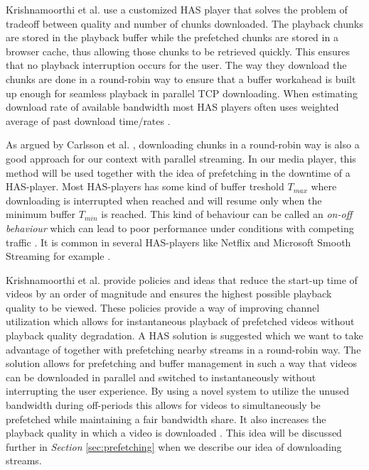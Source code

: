 Krishnamoorthi et al. \cite{qualbranch} use a customized HAS player that solves the problem of tradeoff between quality and number of chunks downloaded. The playback chunks are stored in the playback buffer while the prefetched chunks are stored in a browser cache, thus allowing those chunks to be retrieved quickly. This ensures that no playback interruption occurs for the user. The way they download the chunks are done in a round-robin way to ensure that a buffer workahead is built up enough for seamless playback in parallel TCP downloading. When estimating download rate of available bandwidth most HAS players often uses weighted average of past download time/rates \cite{qualbranch}. 

As argued by Carlsson et al. \cite{optimizedstreaming}, downloading chunks in a round-robin way is also a good approach for our context with parallel streaming. In our media player, this method will be used together with the idea of prefetching in the downtime of a HAS-player. Most HAS-players has some kind of buffer treshold $T_{max}$ where downloading is interrupted when reached and will resume only when the minimum buffer $T_{min}$ is reached. This kind of behaviour can be called an \textit{on-off behaviour} which can lead to poor performance under conditions with competing traffic \cite{bandawarePrefetch,whathappens}. It is common in several HAS-players like Netflix and Microsoft Smooth Streaming for example \cite{bandawarePrefetch}. 

Krishnamoorthi et al. \cite{bandawarePrefetch} provide policies and ideas that reduce the start-up time of videos by an order of magnitude and ensures the highest possible playback quality to be viewed. These policies provide a way of improving channel utilization which allows for instantaneous playback of prefetched videos without playback quality degradation. A HAS solution is suggested which we want to take advantage of together with prefetching nearby streams in a round-robin way. The solution allows for prefetching and buffer management in such a way that videos can be downloaded in parallel and switched to instantaneously without interrupting the user experience. By using a novel system to utilize the unused bandwidth during off-periods this allows for videos to simultaneously be prefetched while maintaining a fair bandwidth share. It also increases the playback quality in which a video is downloaded \cite{bandawarePrefetch}. This idea will be discussed further in \textit{Section} \ref{sec:prefetching} when we describe our idea of downloading streams.

